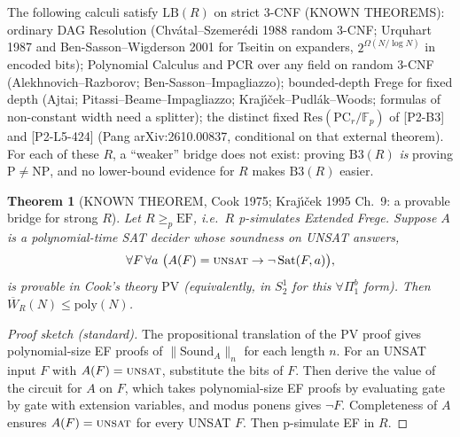 \documentclass[11pt]{article}
\newtheorem{theorem}{Theorem}
\theoremstyle{remark}\newtheorem{remark}[theorem]{Remark}
\begin{document}
\noindent The following calculi satisfy $\mathrm{LB}(R)$ on strict 3-CNF (KNOWN THEOREMS):
ordinary DAG Resolution (Chv\'atal--Szemer\'edi 1988 random 3-CNF; Urquhart 1987 and
Ben-Sasson--Wigderson 2001 for Tseitin on expanders, $2^{\Omega(N/\log N)}$ in encoded bits);
Polynomial Calculus and PCR over any field on random 3-CNF (Alekhnovich--Razborov;
Ben-Sasson--Impagliazzo); bounded-depth Frege for fixed depth (Ajtai; Pitassi--Beame--Impagliazzo;
Kraj\'{\i}\v{c}ek--Pudl\'ak--Woods; formulas of non-constant width need a splitter);
the distinct fixed $\mathrm{Res}(\mathrm{PC}_r/\mathbb F_p)$ of [P2-B3] and [P2-L5-424]
(Pang arXiv:2610.00837, conditional on that external theorem). For each of these $R$, a
``weaker'' bridge does not exist: proving $\mathrm{B3}(R)$ \emph{is} proving
$\mathrm P\ne\mathrm{NP}$, and no lower-bound evidence for $R$ makes $\mathrm{B3}(R)$ easier.

\begin{theorem}[KNOWN THEOREM, Cook 1975; Kraj\'{\i}\v{c}ek 1995 Ch.~9: a provable bridge for strong $R$]\label{thm:cook}
Let $R\ge_p\mathrm{EF}$, i.e.\ $R$ p-simulates Extended Frege. Suppose $A$ is a polynomial-time
SAT decider whose soundness on UNSAT answers,
\[
\forall F\,\forall a\ \bigl(A(F)=\textsc{unsat}\rightarrow \neg\,\mathrm{Sat}(F,a)\bigr),
\]
is provable in Cook's theory $\mathrm{PV}$ (equivalently, in $S^1_2$ for this
$\forall\Pi^b_1$ form). Then $\overline W_R(N)\le\mathrm{poly}(N)$.
\end{theorem}
\begin{proof}[Proof sketch (standard)]
The propositional translation of the PV proof gives polynomial-size EF proofs of
$\|\mathrm{Sound}_A\|_n$ for each length $n$. For an UNSAT input $F$ with $A(F)=\textsc{unsat}$,
substitute the bits of $F$. Then derive the value of the circuit for $A$ on $F$, which takes
polynomial-size EF proofs by evaluating gate by gate with extension variables, and modus ponens gives $\neg F$.
Completeness of $A$ ensures $A(F)=\textsc{unsat}$ for every UNSAT $F$. Then p-simulate EF in $R$.
\end{proof}
\end{document}
